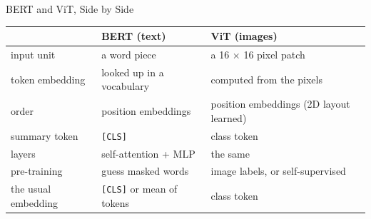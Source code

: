 \begin{frame}{BERT and ViT, Side by Side}
\vspace{0.1cm}
\centering
{\small
\begin{tabular}{@{}p{3.0cm}p{3.9cm}p{3.9cm}@{}}
\toprule
 & \textbf{BERT} (text) & \textbf{ViT} (images) \\
\midrule
input unit & a word piece & a 16 $\times$ 16 pixel patch \\
token embedding & looked up in a vocabulary & computed from the pixels \\
order & position embeddings & position embeddings (2D layout learned) \\
summary token & \texttt{[CLS]} & class token \\
layers & self-attention + MLP & the same \\
pre-training & guess masked words & image labels, or self-supervised \\
the usual embedding & \texttt{[CLS]} or mean of tokens & class token \\
\bottomrule
\end{tabular}}

\vspace{0.3cm}
\raggedright
{}
\end{frame}

